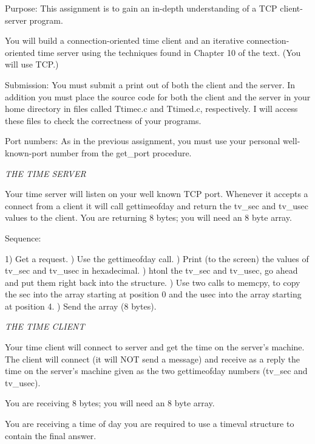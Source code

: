 

\parindent 0pt

Purpose: This assignment is to gain an in-depth understanding of
a TCP client-server program.

You will build a connection-oriented time client and an iterative
connection-oriented time server using the techniques found in Chapter 10
of the text. (You will use TCP.)

Submission: You must submit a print out of both the client and the server.
In addition you must place the source code for both the client and
the server in your home directory in files called {\ltt{}Ttimec.c}
and {\ltt{}Ttimed.c}, respectively. I will access these files to check
the correctness of your programs.

Port numbers: As in the previous assignment, you must use your personal
well-known-port number from the {\ltt{}get_port} procedure.

\noindent
{\it THE TIME SERVER}

Your time server will listen on your well known TCP port.
Whenever it accepts a connect from a client it will call {\ltt{}gettimeofday}
and return the {\ltt{}tv_sec} and {\ltt{}tv_usec} values to the client.
You are returning 8 bytes; you will need an 8 byte array.

Sequence:

1) Get a request.
\hfill{}) Use the {\ltt{}gettimeofday} call.
\hfill{}) Print (to the screen) the values of
{\ltt{}tv_sec} and {\ltt{}tv_usec} in hexadecimal.
\hfill{}) htonl the {\ltt{}tv_sec} and {\ltt{}tv_usec},
go ahead and put them right back into the structure.
\hfill{}) Use two calls to {\ltt{}memcpy}, to copy the sec into
the array starting at position 0 and
the usec into the array starting at position 4.
\hfill{}) Send the array (8 bytes).

\noindent
{\it THE TIME CLIENT}

Your time client will connect to server and get the time on the server's 
machine.
The client will connect (it will NOT send a message) and receive as a
reply the time on the server's machine given as the two {\ltt{}gettimeofday}
numbers ({\ltt{}tv_sec} and {\ltt{}tv_usec}).

You are receiving 8 bytes; you will need an 8 byte array.

You are receiving a time of day you are required to
use a {\ltt{}timeval} structure to contain the final answer.

